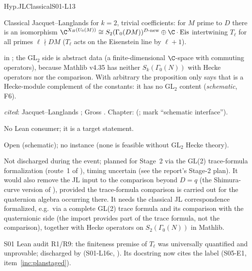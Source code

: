 \begin{hypentry}{Hyp.JLClassical}{\kindoos}{S01-L13}
\item[Statement] Classical Jacquet--Langlands for $k=2$, trivial coefficients: for $M$ prime to $D$ there is an
  isomorphism $\C^{X_B(U_0(M))}\cong S_2(\Gamma_0(DM))^{D\text{-new}}\oplus\C\cdot\mathrm{Eis}$ intertwining $T_\ell$ for
  all primes $\ell\nmid DM$ ($T_\ell$ acts on the Eisenstein line by $\ell+1$).
\item[Lean]  in ; the GL$_2$ side is abstract data
   (a finite-dimensional $\C$-space with commuting operators), because Mathlib v4.35 has
  neither $S_k(\Gamma_0(N))$ with Hecke operators nor the comparison. With arbitrary  the proposition only says
  that  is a Hecke-module complement of the constants: it has no GL$_2$ content (\emph{schematic}, F6).
\item[Source] \emph{cited}: Jacquet--Langlands \cite{JL}; Gross \cite{Gr99}. Chapter: 
  (\stcited;  mark ``schematic interface'').
\item[Used by] No Lean consumer; it is a target statement.
\item[Status] Open (schematic); no instance (none is feasible without GL$_2$ Hecke theory).
\item[Discharge] Not discharged during the event; planned for Stage~2 via the GL(2) trace-formula formalization (route~1 of
  ), timing uncertain (see the report's Stage-2 plan). It would also remove the JL input to the comparison
  beyond $D=q$ (the Shimura-curve version of ), provided the trace-formula comparison is carried out for the quaternion algebra occurring there. It needs the classical JL correspondence formalized, e.g.\ via a complete GL(2) trace
  formula and its comparison with the quaternionic side (the import provides part of the trace formula, not the
  comparison), together with Hecke operators on $S_2(\Gamma_0(N))$ in Mathlib.
\item[History] S01 Lean audit R1/R9: the finiteness premise  of $T_\ell$ was universally quantified
  and unprovable; discharged by  (S01-L16c, ). Its docstring now cites the
   label (S05-E1, item~\ref{inc:planstaged}).
\end{hypentry}

